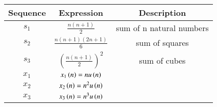 \begin{tabular}{|c|c|c|}
    \hline
    \textbf{Sequence} & \textbf{Expression} & \textbf{Description} \\
    \hline
    \(s_1\) & \(\frac{n(n+1)}{2}\) & sum of n natural numbers\\
    \hline
    \(s_2\) & \(\frac{n(n+1)(2n+1)}{6}\) & sum of squares\\
    \hline
    \(s_3\) & \(\left(\frac{n(n+1)}{2}\right)^2\) & sum of cubes \\
    \hline
    \(x_1\) & \(x_1\left(n\right) = n u\left(n\right)\) & \\
    \hline
    \(x_2\) & \(x_2\left(n\right) = n^2 u\left(n\right)\) &  \\
    \hline
    \(x_3\) & \(x_3\left(n\right) = n^3 u\left(n\right)\) & \\
    \hline
\end{tabular}

